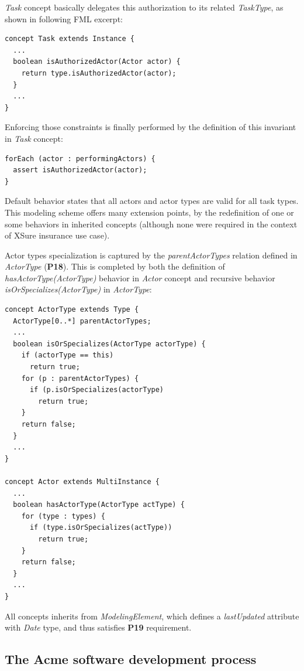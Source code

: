 \textit{Task} concept basically delegates this authorization to its related \textit{TaskType}, as shown in following FML excerpt:

\begin{lstlisting}
concept Task extends Instance {
  ...
  boolean isAuthorizedActor(Actor actor) {      
    return type.isAuthorizedActor(actor);      
  }
  ...
}
\end{lstlisting}

Enforcing those constraints is finally performed by the definition of this invariant in \textit{Task} concept:

\begin{lstlisting}
forEach (actor : performingActors) {
  assert isAuthorizedActor(actor);
}
\end{lstlisting}

Default behavior states that all actors and actor types are valid for all task types. This modeling scheme offers many extension points, by the redefinition of one or some behaviors in inherited concepts (although none were required in the context of XSure insurance use case).

Actor types specialization is captured by the \textit{parentActorTypes} relation defined in \textit{ActorType} (\textbf{P18}). This is completed by both the definition of \textit{hasActorType(ActorType)} behavior in \textit{Actor} concept and recursive behavior \textit{isOrSpecializes(ActorType)} in \textit{ActorType}:

\begin{lstlisting}
concept ActorType extends Type {
  ActorType[0..*] parentActorTypes;
  ...
  boolean isOrSpecializes(ActorType actorType) {    
    if (actorType == this)   
      return true;      
    for (p : parentActorTypes) {      
      if (p.isOrSpecializes(actorType)
        return true;
    }
    return false;
  }
  ...
}

concept Actor extends MultiInstance {
  ...
  boolean hasActorType(ActorType actType) {      
    for (type : types) {
      if (type.isOrSpecializes(actType))
        return true;
    }
    return false;
  }     
  ...
}
\end{lstlisting}

All concepts inherits from \textit{ModelingElement}, which defines a \textit{lastUpdated} attribute with \textit{Date} type, and thus satisfies \textbf{P19} requirement. 

\subsection{The Acme software development process}
\label{sec:AcmeSoftwareDevelopmentProcess}

